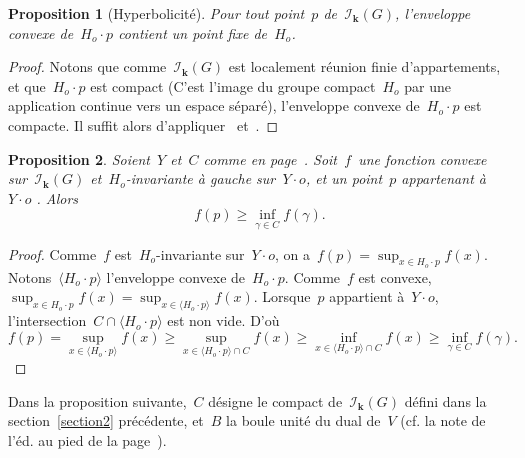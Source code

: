 \documentclass[french]{amsart}
\newcommand{\kk}{\mathbf{k}}
\newcommand{\Ik}{\mathscr{I}_\kk}
\newtheorem{proposition}{Proposition}[section]
\begin{document}
\begin{proposition}[Hyperbolicité]\label{prop37}\label{Prop37}
Pour tout point~$p$ de~$\Ik (G)$, l'enveloppe
convexe de~$H_o \cdot p$ contient un point fixe de~$H_o$.
\end{proposition}
\begin{proof} Notons que comme~$\Ik(G)$ est localement réunion finie d'appartements, et que~$H_o\cdot p$ est compact (C'est l'image du groupe compact~$H_o$ par une application continue vers un espace séparé), l'enveloppe convexe de~$H_o \cdot p$ est compacte. Il suffit alors d'appliquer~\cite[2.3.1]{Tit79} et~\cite[3.2.3]{BT72}.
\end{proof}
\begin{proposition}\label{Prop38}Soient~$Y$ et~$C$ comme en page~\pageref{Defi Y}.
Soit~$f$~une fonction convexe sur~$\Ik (G)$ et~$H_o$-invariante à gauche sur~$Y \cdot o$, et un point~$p$ appartenant à~$Y \cdot o$ . Alors
\begin{equation}\label{eq11}
f(p)\geq\inf_{\gamma\in C }f(\gamma).
\end{equation}
\end{proposition}
\begin{proof}Comme~$f$ est~$H_o$-invariante sur~$Y\cdot o$, on a~$f(p)=\sup_{x\in H_o\cdot p} f(x)$. Notons~$\langle H_o\cdot p\rangle$ l'enveloppe convexe de~$H_o\cdot p$. Comme~$f$ est convexe,~$\sup_{x\in H_o\cdot p} f(x)=\sup_{x\in \langle H_o\cdot p\rangle} f(x)$. Lorsque~$p$ appartient à~$Y\cdot o$, l'intersection~$C\cap\langle H_o\cdot p\rangle$ est non vide. D'où
\[
f(p)=\sup_{x\in\langle H_o\cdot p\rangle} f(x)\geq \sup_{x\in \langle H_o\cdot p\rangle\cap C} f(x)\geq\inf_{x\in \langle H_o\cdot p\rangle\cap C} f(x)\geq \inf_{\gamma\in C} f(\gamma).
\]
\end{proof}
Dans la proposition suivante,~$C$ désigne le compact de~$\Ik(G)$ défini dans la section~\ref{section2} précédente, et~$B$ la boule unité du dual de~$V$ (cf. la note de l'éd. au pied de la page~\pageref{pied B}).
\end{document}
